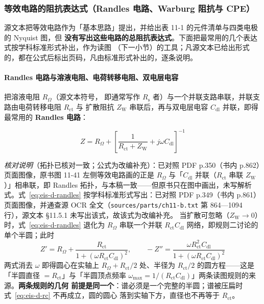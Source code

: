 \subsubsection{等效电路的阻抗表达式（Randles 电路、Warburg 阻抗与 CPE）}

源文本把等效电路作为「基本思路」提出，并给出表 11-1 的元件清单与四类电极的 Nyquist 图，但
\textbf{没有写出这些电路的总阻抗表达式}。下面把最常用的几个表达式按学科标准形式补出，作为读图
（下一小节）的工具；凡源文本已给出形式的，都在公式后标出页码，凡由标准形式补出的，逐条说明。

\paragraph{Randles 电路与溶液电阻、电荷转移电阻、双电层电容} 把溶液电阻 $R_{\Omega}$（源文本符号，
即通常写作 $R_{\mathrm{s}}$ 者）与一个并联支路串联，并联支路由电荷转移电阻 $R_{\mathrm{ct}}$ 与
扩散阻抗 $Z_{\mathrm{W}}$ 串联后，再与双电层电容 $C_{\mathrm{dl}}$ 并联，即得最常用的
\textbf{Randles 电路}：

\begin{equation}
Z=R_{\Omega}+\left[\frac{1}{R_{\mathrm{ct}}+Z_{\mathrm{W}}}
+j\omega C_{\mathrm{dl}}\right]^{-1}
\label{eq:eis-d-randles}
\end{equation}

\emph{核对说明}（拓扑已核对一致；公式为改编补充）：已对照 PDF p.350（书内 p.862）页面图像，原书图 11-41 左侧等效电路画的正是 $R_\Omega$ 与「$C_{\mathrm{dl}}$ 并联（$R_{\mathrm{ct}}$ 串联 $Z_{\mathrm{W}}$）」相串联，即 Randles 拓扑，与本稿一致——但原书只在图中画出，未写解析式。式~\eqref{eq:eis-d-randles} 按学科标准形式写出：已对照 PDF p.349（书内 p.861）页面图像，并通查源 OCR 全文（\texttt{sources/parts/ch11-b.txt} 第 864—1094 行），源文本 §11.5.1 未写出该式，故该式为改编补充。
当扩散可忽略（$Z_{\mathrm{W}}\to0$）时，式~\eqref{eq:eis-d-randles} 退化为
$R_{\Omega}$ 串联一个并联 $R_{\mathrm{ct}}C_{\mathrm{dl}}$ 网络，即规则二讨论的单个半圆；此时
\begin{equation}
Z'=R_{\Omega}+\frac{R_{\mathrm{ct}}}{1+(\omega R_{\mathrm{ct}}C_{\mathrm{dl}})^{2}},
\qquad
-Z''=\frac{\omega R_{\mathrm{ct}}^{2}C_{\mathrm{dl}}}{1+(\omega R_{\mathrm{ct}}C_{\mathrm{dl}})^{2}}
\label{eq:eis-d-rc}
\end{equation}
两式消去 $\omega$ 即得圆心在实轴上 $R_{\Omega}+R_{\mathrm{ct}}/2$ 处、半径为 $R_{\mathrm{ct}}/2$
的圆方程——这是「半圆直径 $=R_{\mathrm{ct}}$」与「半圆顶点频率
$\omega_{\max}=1/(R_{\mathrm{ct}}C_{\mathrm{dl}})$」两条读图规则的来源。\textbf{两条规则的几何
前提是同一个}：谱必须是一个完整的半圆；谱被压扁时式~\eqref{eq:eis-d-rc} 不再成立，圆的圆心
落到实轴下方，直径也不再等于 $R_{\mathrm{ct}}$。

